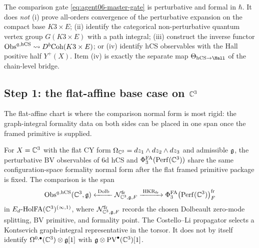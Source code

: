 \begin{remark}
\label{rem:agent06-out-of-scope}
The comparison gate \eqref{eq:agent06-master-gate} is perturbative and
formal in $\hbar$. It does \emph{not} (i) prove all-orders convergence
of the perturbative expansion on the compact base $K3\times E$;
(ii) identify the categorical non-perturbative quantum vertex group
$G(K3 \times E)$ with a path integral; (iii) construct the inverse
functor $\mathrm{Obs}^{q,\mathrm{hCS}} \rightsquigarrow D^b\mathrm{Coh}(K3 \times E)$; or
(iv) identify hCS observables with the Hall positive half $Y^+(X)$.
Item \textup{(iv)} is exactly the separate map
$\Theta_{\hCS\to\Hall}$ of the chain-level bridge.
\end{remark}

\subsection*{Step 1: the flat-affine base case on $\mathbb C^3$}
\label{sec:agent06-step1-c3}

The flat-affine chart is where the comparison normal form is most
rigid: the graph-integral formality data on both sides can be placed in
one span once the framed primitive is supplied.

\begin{proposition}
\label{prop:agent06-flat-c3-identification}
For $X = \mathbb C^3$ with the flat CY form $\Omega_{\mathbb C^3} = dz_1 \wedge
dz_2 \wedge dz_3$ and admissible $\mathfrak g$, the perturbative BV
observables of $6$d hCS and $\Phi^{\mathrm{FA}}_3(\mathrm{Perf}(\mathbb C^3))$ share the same
configuration-space formality normal form after the flat framed
primitive package is fixed. The comparison is the span
\begin{equation}
\label{eq:agent06-flat-c3-master}
 \mathrm{Obs}^{q,\mathrm{hCS}}(\mathbb C^3,\mathfrak g)
 \xleftarrow{\;\mathrm{Dolb}\;}
 \mathcal N_{\mathbb C^3,\mathfrak g,F}^{\mathrm{fr}}
 \xrightarrow{\;\mathrm{HKR}_{\mathrm{fr}}\;}
 \Phi^{\mathrm{FA}}_3\bigl(\mathrm{Perf}(\mathbb C^3)\bigr)_{F}^{\mathrm{fr}}
\end{equation}
in $E_d\text{-}\mathrm{HolFA}(\mathbb C^3)^{(\infty,1)}$, where
$\mathcal N_{\mathbb C^3,\mathfrak g,F}^{\mathrm{fr}}$ records the chosen
Dolbeault zero-mode splitting, BV primitive, and formality point. The
Costello--Li propagator selects a Kontsevich graph-integral
representative in the torsor. It does not by itself identify
$\Omega^{0,\bullet}(\mathbb C^3)\otimes\mathfrak g[1]$ with
$\mathfrak g\otimes\mathrm{PV}^\bullet(\mathbb C^3)[1]$.
\end{proposition}

